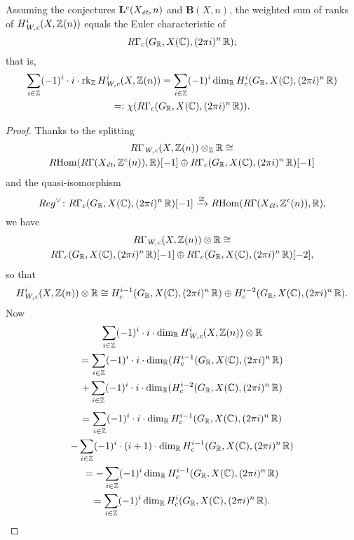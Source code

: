 \begin{proposition}
  \label{prop:alternating-weighted-sum-as-euler-characteristic}
  Assuming the conjectures $\mathbf{L}^c (X_\text{\it ét}, n)$ and
  $\mathbf{B} (X,n)$, the weighted sum of ranks of
  $H^i_\text{\it W,c} (X, \mathbb{Z} (n))$ equals the Euler characteristic of
  $$R\Gamma_c (G_{\mathbb{R}}, X (\mathbb{C}), (2\pi i)^n\,\mathbb{R});$$
  that is,
  \begin{multline*}
    \sum_{i\in\mathbb{Z}} (-1)^i \cdot i \cdot \operatorname{rk}_{\mathbb{Z}} H^i_\text{\it W,c} (X, \mathbb{Z} (n)) =
    \sum_{i\in\mathbb{Z}} (-1)^i \dim_{\mathbb{R}} H^i_c (G_{\mathbb{R}}, X (\mathbb{C}), (2\pi i)^n\,\mathbb{R}) \\
    =\mathrel{\mathop:} \chi (R\Gamma_c (G_{\mathbb{R}}, X (\mathbb{C}), (2\pi i)^n\,\mathbb{R})).
  \end{multline*}

  \begin{proof}
    Thanks to the splitting
    \begin{multline*}
      R\Gamma_\text{\it W,c} (X,\mathbb{Z} (n))\otimes_{\mathbb{Z}} \mathbb{R} \cong \\
      R\!\operatorname{Hom} (R\Gamma (X_\text{\it ét}, \mathbb{Z}^c (n)), \mathbb{R}) [-1]
      \oplus
      R\Gamma_c (G_{\mathbb{R}}, X (\mathbb{C}), (2\pi i)^n\,\mathbb{R}) [-1]
    \end{multline*}
    and the quasi-isomorphism
    \[ Reg^\vee\colon R\Gamma_c (G_{\mathbb{R}}, X (\mathbb{C}), (2\pi i)^n\,\mathbb{R}) [-1]
      \xrightarrow{\cong}
      R\!\operatorname{Hom} (R\Gamma (X_\text{\it ét}, \mathbb{Z}^c (n)), \mathbb{R}), \]
    we have
    \begin{multline*}
      R\Gamma_\text{\it W,c} (X,\mathbb{Z} (n))\otimes \mathbb{R} \cong \\
      R\Gamma_c (G_{\mathbb{R}}, X (\mathbb{C}), (2\pi i)^n\,\mathbb{R}) [-1]
      \oplus
      R\Gamma_c (G_{\mathbb{R}}, X (\mathbb{C}), (2\pi i)^n\,\mathbb{R}) [-2],
    \end{multline*}
    so that
    \[ H^i_\text{\it W,c} (X,\mathbb{Z} (n))\otimes \mathbb{R}
      \cong
      H^{i-1}_c (G_{\mathbb{R}}, X (\mathbb{C}), (2\pi i)^n\,\mathbb{R})
      \oplus
      H^{i-2}_c (G_{\mathbb{R}}, X (\mathbb{C}), (2\pi i)^n\,\mathbb{R}). \]
    Now
    \begin{multline*}
      \sum_{i\in\mathbb{Z}} (-1)^i \cdot i \cdot \dim_{\mathbb{R}} H^i_\text{\it W,c} (X, \mathbb{Z} (n))\otimes \mathbb{R} \\
      = \sum_{i\in\mathbb{Z}} (-1)^i \cdot i \cdot \dim_{\mathbb{R}} (H^{i-1}_c (G_{\mathbb{R}}, X (\mathbb{C}), (2\pi i)^n\,\mathbb{R}) \\
      + \sum_{i\in\mathbb{Z}} (-1)^i \cdot i \cdot \dim_{\mathbb{R}} (H^{i-2}_c (G_{\mathbb{R}}, X (\mathbb{C}), (2\pi i)^n\,\mathbb{R})
    \end{multline*}
    \begin{multline*}
      = \sum_{i\in\mathbb{Z}} (-1)^i \cdot i \cdot \dim_{\mathbb{R}} H^{i-1}_c (G_{\mathbb{R}}, X (\mathbb{C}), (2\pi i)^n\,\mathbb{R}) \\
      - \sum_{i\in\mathbb{Z}} (-1)^i \cdot (i+1) \cdot \dim_{\mathbb{R}} H^{i-1}_c (G_{\mathbb{R}}, X (\mathbb{C}), (2\pi i)^n\,\mathbb{R}) \\
      = - \sum_{i\in\mathbb{Z}} (-1)^i \dim_{\mathbb{R}} H^{i-1}_c (G_{\mathbb{R}}, X (\mathbb{C}), (2\pi i)^n\,\mathbb{R}) \\
      = \sum_{i\in\mathbb{Z}} (-1)^i \dim_{\mathbb{R}} H^i_c (G_{\mathbb{R}}, X (\mathbb{C}), (2\pi i)^n\,\mathbb{R}).
    \end{multline*}
  \end{proof}
\end{proposition}

